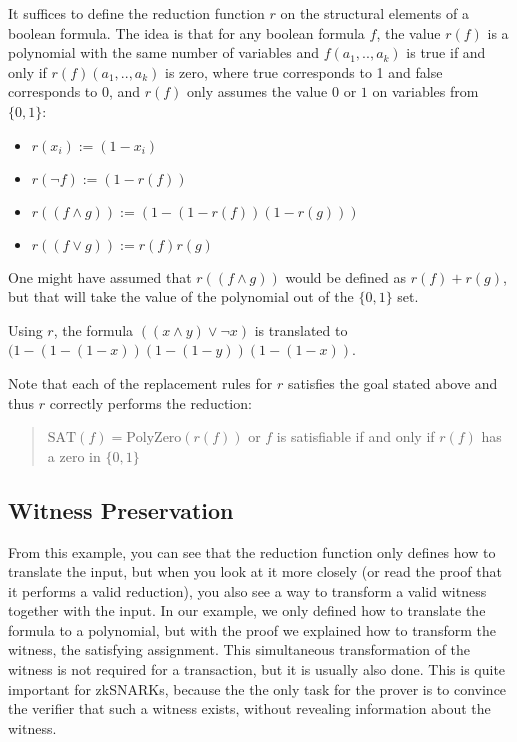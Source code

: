 \documentclass[11pt,letterpaper]{article}
\begin{document}
It suffices to define the reduction function $r$ on the structural elements of a boolean formula. The idea is that for any boolean formula $f$, the value $r(f)$ is a polynomial with the same number of variables and $f(a_{1},..,a_{k})$ is true if and only if $r(f)(a_{1},..,a_{k})$ is zero, where true corresponds to 1 and false corresponds to 0, and $r(f)$ only assumes the value $0$ or $1$ on variables from $\{0, 1\}$:
\begin{itemize}
\item $r(x_{i}) := (1 - x_{i})$
\item $r(\neg f) := (1 - r(f))$
\item $r((f \land g)) := (1 - (1 - r(f))(1 - r(g)))$
\item $r((f \lor  g)) := r(f)r(g)$
\end{itemize}


One might have assumed that $r((f \land g))$ would be defined as $r(f) + r(g)$, but that will take the value of the polynomial out of the $\{0, 1\}$ set.


Using $r$, the formula $((x \land y) \lor \neg x)$ is translated to $(1 - (1 - (1 - x))(1 - (1 - y))(1 - (1 - x))$.


Note that each of the replacement rules for $r$ satisfies the goal stated above and thus $r$ correctly performs the reduction:
\begin{quote}
$\mathrm{SAT}(f) = \mathrm{PolyZero}(r(f))$ or $f$ is satisfiable if and only if $r(f)$ has a zero in $\{0, 1\}$
\end{quote}


\subsection{Witness Preservation}


From this example, you can see that the reduction function only defines how to translate the input, but when you look at it more closely (or read the proof that it performs a valid reduction), you also see a way to transform a valid witness together with the input. In our example, we only defined how to translate the formula to a polynomial, but with the proof we explained how to transform the witness, the satisfying assignment. This simultaneous transformation of the witness is not required for a transaction, but it is usually also done. This is quite important for zkSNARKs, because the the only task for the prover is to convince the verifier that such a witness exists, without revealing information about the witness.
\end{document}
